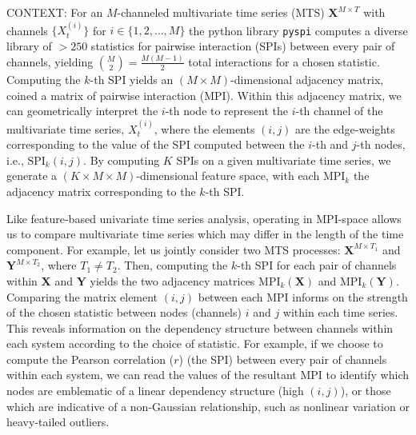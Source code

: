 \documentclass{article}
\theoremstyle{plain}
\theoremstyle{definition}
\theoremstyle{remark}
\begin{document}
CONTEXT: For an $M$-channeled multivariate time series (MTS) $\mathbf{X}^{M \times T}$ with channels $\{X_t^{(i)}\}$ for $i \in \{1, 2, \dots, M\}$ the python library \texttt{pyspi} computes a diverse library of $>250$ statistics for pairwise interaction (SPIs) between every pair of channels, yielding ${M \choose 2}=\frac{M(M-1)}{2}$ total interactions for a chosen statistic. Computing the $k$-th SPI yields an $(M \times M)$-dimensional adjacency matrix, coined a matrix of pairwise interaction (MPI). Within this adjacency matrix, we can geometrically interpret the $i$-th node to represent the $i$-th channel of the multivariate time series, $X_t^{(i)}$, where the elements $(i,j)$ are the edge-weights corresponding to the value of the SPI computed between the $i$-th and $j$-th nodes, i.e., $\mathrm{SPI}_k(i,j)$. By computing $K$ SPIs on a given multivariate time series, we generate a $(K \times M \times M)$-dimensional feature space, with each $\mathrm{MPI}_k$ the adjacency matrix corresponding to the $k$-th SPI.

Like feature-based univariate time series analysis, operating in MPI-space allows us to compare multivariate time series which may differ in the length of the time component. For example, let us jointly consider two MTS processes: $\mathbf{X}^{M \times T_1}$ and $\mathbf{Y}^{M \times T_2}$, where $T_1 \neq T_2$. Then, computing the $k$-th SPI for each pair of channels within $\mathbf{X}$ and $\mathbf{Y}$ yields the two adjacency matrices $\mathrm{MPI}_k({\mathbf{X}})$ and $\mathrm{MPI}_k({\mathbf{Y}})$. Comparing the matrix element $(i,j)$ between each MPI informs on the strength of the chosen statistic between nodes (channels) $i$ and $j$ within each time series. This reveals information on the dependency structure between channels within each system according to the choice of statistic. For example, if we choose to compute the Pearson correlation ($r$) (the SPI) between every pair of channels within each system, we can read the values of the resultant MPI to identify which nodes are emblematic of a linear dependency structure (high $(i,j)$), or those which are indicative of a non-Gaussian relationship, such as nonlinear variation or heavy-tailed outliers.
\end{document}
